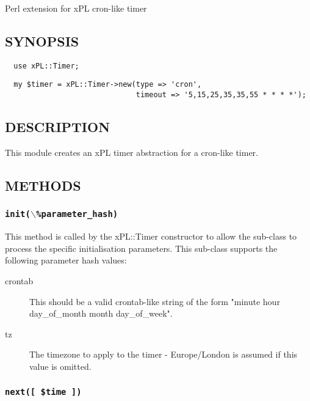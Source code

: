 Perl extension for xPL cron-like timer

\subsection*{SYNOPSIS\label{xPL::Timer::cron_SYNOPSIS}}
\begin{verbatim}
  use xPL::Timer;
\end{verbatim}
\begin{verbatim}
  my $timer = xPL::Timer->new(type => 'cron',
                              timeout => '5,15,25,35,35,55 * * * *');
\end{verbatim}
\subsection*{DESCRIPTION\label{xPL::Timer::cron_DESCRIPTION}}


This module creates an xPL timer abstraction for a cron-like timer.

\subsection*{METHODS\label{xPL::Timer::cron_METHODS}}
\subsubsection*{\texttt{init($\backslash$\%parameter\_hash)}\label{xPL::Timer::cron_init_backslash_parameter_hash_}}


This method is called by the xPL::Timer constructor to allow the
sub-class to process the specific initialisation parameters.  This
sub-class supports the following parameter hash values:

\begin{description}

\item[{crontab}] \mbox{}

This should be a valid crontab-like string of the form
"minute hour day\_of\_month month day\_of\_week".


\item[{tz}] \mbox{}

The timezone to apply to the timer - Europe/London is assumed if this
value is omitted.

\end{description}
\subsubsection*{\texttt{next([ \$time ])}\label{xPL::Timer::cron_next_time_}}


